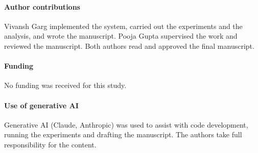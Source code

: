 \documentclass[12pt,a4paper]{article}
\begin{document}
{\paragraph{Author contributions} Vivansh Garg implemented the system, carried out the
experiments and the analysis, and wrote the manuscript. Pooja Gupta supervised the work and
reviewed the manuscript. Both authors read and approved the final manuscript.

\paragraph{Funding} No funding was received for this study.

\paragraph{Use of generative AI} Generative AI (Claude, Anthropic) was used to assist with
code development, running the experiments and drafting the manuscript. The authors take full
responsibility for the content.

\clearpage
\printbibliography[heading=bibintoc,title={References}]
}{}
\end{document}
